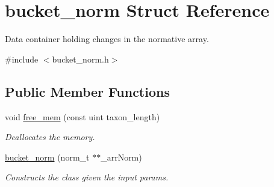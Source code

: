 \hypertarget{structbucket__norm}{
\section{bucket\_\-norm Struct Reference}
\label{structbucket__norm}
}


Data container holding changes in the normative array.  




{\ttfamily \#include $<$bucket\_\-norm.h$>$}

\subsection*{Public Member Functions}
\begin{DoxyCompactItemize}
\item 
\hypertarget{structbucket__norm_a098e27251fcc03ea84ed7b894b050a81}{
void \hyperlink{structbucket__norm_a098e27251fcc03ea84ed7b894b050a81}{free\_\-mem} (const uint taxon\_\-length)}
\label{structbucket__norm_a098e27251fcc03ea84ed7b894b050a81}

\begin{DoxyCompactList}\small\item\em Deallocates the memory. \end{DoxyCompactList}\item 
\hypertarget{structbucket__norm_a80f7dad6e8bc0e3cc36a7d7877f4b680}{
\hyperlink{structbucket__norm_a80f7dad6e8bc0e3cc36a7d7877f4b680}{bucket\_\-norm} (norm\_\-t $\ast$$\ast$\_\-arrNorm)}
\label{structbucket__norm_a80f7dad6e8bc0e3cc36a7d7877f4b680}

\begin{DoxyCompactList}\small\item\em Constructs the class given the input params. \end{DoxyCompactList}\end{DoxyCompactItemize}
